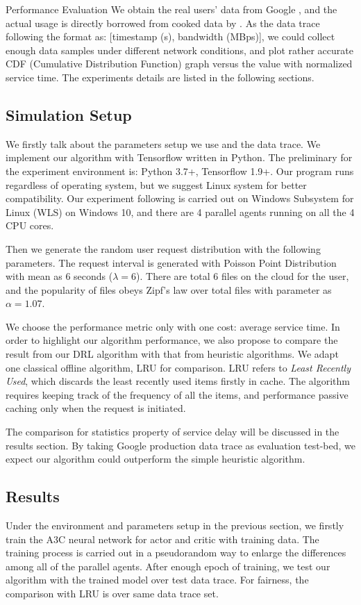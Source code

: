 \documentclass{article}
\begin{document}
\begin{section}{Performance Evaluation}
    \label{exp}
    We obtain the real users' data from Google \cite{clusterdata:Reiss2011}, and the actual usage is directly borrowed from cooked data by \cite{Pensieve}. As the data trace following the format as: [timestamp (s), bandwidth (MBps)], we could collect enough data samples under different network conditions, and plot rather accurate CDF (Cumulative Distribution Function) graph versus the value with normalized service time. The experiments details are listed in the following sections. 
    
    \subsection{Simulation Setup}
    We firstly talk about the parameters setup we use and the data trace.
    We implement our algorithm with Tensorflow written in Python. The preliminary for the experiment environment is: Python 3.7+, Tensorflow 1.9+. Our program runs regardless of operating system, but we suggest Linux system for better compatibility. Our experiment following is carried out on Windows Subsystem for Linux (WLS) on Windows 10, and there are 4 parallel agents running on all the 4 CPU cores.

    Then we generate the random user request distribution with the following parameters. 
    The request interval is generated with Poisson Point Distribution with mean as 6 seconds ($\lambda=6$). There are total 6 files on the cloud for the user, and the popularity of files obeys Zipf's law over total files with parameter as $\alpha=1.07$.

    We choose the performance metric only with one cost: average service time. In order to highlight our algorithm performance, we also propose to compare the result from our DRL algorithm with that from heuristic algorithms. We adapt one classical offline algorithm, LRU for comparison. LRU refers to \textit{Least Recently Used}, which discards the least recently used items firstly in cache. The algorithm requires keeping track of the frequency of all the items, and performance passive caching only when the request is initiated.

    The comparison for statistics property of service delay will be discussed in the results section. By taking Google production data trace as evaluation test-bed, we expect our algorithm could outperform the simple heuristic algorithm.    

    \subsection{Results}
    Under the environment and parameters setup in the previous section, we firstly train the A3C neural network for actor and critic with training data. The training process is carried out in a pseudorandom way to enlarge the differences among all of the parallel agents. After enough epoch of training, we test our algorithm with the trained model over test data trace. For fairness, the comparison with LRU is over same data trace set.


\end{section}
\end{document}
